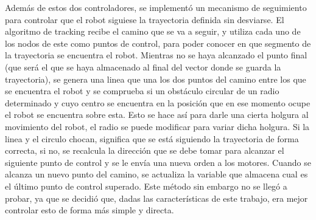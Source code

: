 Además de estos dos controladores, se implementó un mecanismo de seguimiento para controlar que el robot siguiese la trayectoria definida sin desviarse. El algoritmo de tracking recibe el camino que se va a seguir, y utiliza cada uno de los nodos de este como puntos de control, para poder conocer en que segmento de la trayectoria se encuentra el robot. Mientras no se haya alcanzado el punto final (que será el que se haya almacenado al final del vector donde se guarda la trayectoria), se genera una linea que una los dos puntos del camino entre los que se encuentra el robot y se comprueba si un obstáculo circular de un radio determinado y cuyo centro se encuentra en la posición que en ese momento ocupe el robot se encuentra sobre esta. Esto se hace así para darle una cierta holgura al movimiento del robot, el radio se puede modificar para variar dicha holgura. Si la linea y el circulo chocan, significa que se está siguiendo la trayectoria de forma correcta, si no, se recalcula la dirección que se debe tomar para alcanzar el siguiente punto de control y se le envía una nueva orden a los motores. Cuando se alcanza un nuevo punto del camino, se actualiza la variable que almacena cual es el último punto de control superado. Este método sin embargo no se llegó a probar, ya que se decidió que, dadas las características de este trabajo, era mejor controlar esto de forma más simple y directa.  